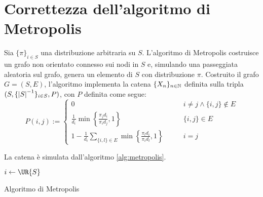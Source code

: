 \section{Correttezza dell'algoritmo di Metropolis}

Sia $\{\pi\}_{i\in S}$ una distribuzione arbitraria su $S$. L'algoritmo di Metropolis costruisce un grafo non orientato connesso sui nodi in $S$ e, simulando una passeggiata aleatoria sul grafo, genera un elemento di $S$ con distribuzione $\pi$.
Costruito il grafo $G=(S,E)$, l'algoritmo implementa la catena $\{X_n\}_{n\in\mathbb N}$ definita sulla tripla $(S,\{\left|S\right|^{-1}\}_{i\in S},P)$, con $P$ definita come segue:
\begin{equation*}
	P(i,j):=\begin{cases}
		0                                                                                                    & \qquad i\ne j\land \{i,j\}\notin E \\[1ex]
		\displaystyle \frac{1}{d_i} \min\left\{\frac{\pi_j d_i}{\pi_i d_j},1\right\}                         & \qquad \{i,j\}\in E                \\[2ex]
		\displaystyle 1 - \frac{1}{d_i} \sum_{\{i,l\}\in E} \min\left\{\frac{\pi_l d_i}{\pi_i d_l},1\right\} & \qquad i=j
	\end{cases}
\end{equation*}

La catena è simulata dall'algoritmo \ref{alg:metropolis}.
\begin{algorithm}
	\DontPrintSemicolon

	$i\asn\UR{S}$ \;

	 \;

	\caption{Algoritmo di Metropolis}
	\label{alg:metropolis}
\end{algorithm}

